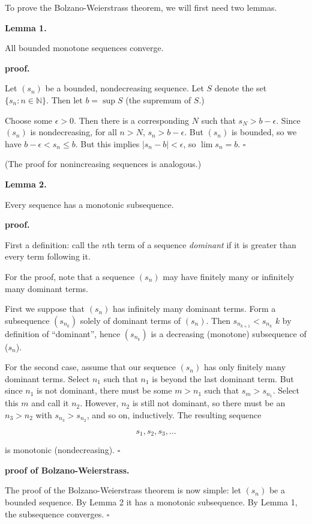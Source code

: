 \documentclass[12pt]{article}
\begin{document}
To prove the Bolzano-Weierstrass theorem, we will first need two lemmas.  

{\bf Lemma 1.}

All bounded monotone sequences converge.

{\bf proof.}

Let $(s_n)$ be a bounded, nondecreasing sequence.  Let $S$ denote the set $\{s_n : n \in \mathbb{N}\}$.  Then let $b=\sup S$ (the supremum of $S$.)

Choose some $\epsilon > 0$.  Then there is a corresponding $N$ such that $s_N>b-\epsilon$.  Since $(s_n)$ is nondecreasing, for all $n>N$, $s_n > b-\epsilon$.  But $(s_n)$ is bounded, so we have $b-\epsilon < s_n \le b$.  But this implies $|s_n-b|<\epsilon$, so $\lim s_n= b$. $\square$

(The proof for nonincreasing sequences is analogous.)

{\bf Lemma 2.}

Every sequence has a monotonic subsequence.

{\bf proof.}

First a definition: call the $n$th term of a sequence \emph{dominant} if it is greater than every term following it.

For the proof, note that a sequence $(s_n)$ may have finitely many or infinitely many dominant terms.  

First we suppose that $(s_n)$ has infinitely many dominant terms.  Form a subsequence $(s_{n_k})$ solely of dominant terms of $(s_n)$.  Then $s_{n_{k+1}} < s_{n_k}$ $k$ by definition of ``dominant'', hence $(s_{n_k})$ is a decreasing  (monotone) subsequence of ($s_n$).

For the second case, assume that our sequence $(s_n)$ has only finitely many dominant terms.  Select $n_1$ such that $n_1$ is beyond the last dominant term.  But since $n_1$ is not dominant, there must be some $m>n_1$ such that $s_m > s_{n_1}$.  Select this $m$ and call it $n_2$.  However, $n_2$ is still not dominant, so there must be an $n_3>n_2$ with $s_{n_3} > s_{n_2}$, and so on, inductively.  The resulting sequence

$$ s_1,s_2,s_3,\ldots $$

is monotonic (nondecreasing). $\square$

{\bf proof of Bolzano-Weierstrass.}

The proof of the Bolzano-Weierstrass theorem is now simple: let $(s_n)$ be a bounded sequence.  By Lemma 2 it has a monotonic subsequence.  By Lemma 1, the subsequence converges.  $\square$
\end{document}
